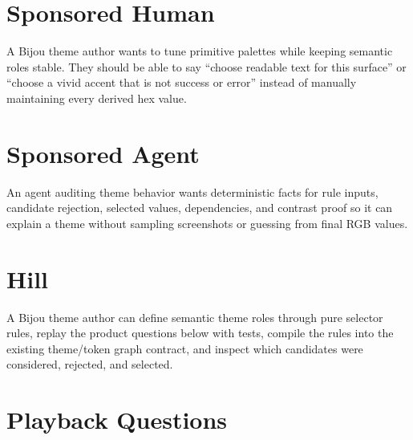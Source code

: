 \section{Sponsored Human}\label{record-184-sponsored-human}

A Bijou theme author wants to tune primitive palettes while keeping semantic roles stable. They should be able to say ``choose readable text for this surface'' or ``choose a vivid accent that is not success or error'' instead of manually maintaining every derived hex value.

\section{Sponsored Agent}\label{record-184-sponsored-agent}

An agent auditing theme behavior wants deterministic facts for rule inputs, candidate rejection, selected values, dependencies, and contrast proof so it can explain a theme without sampling screenshots or guessing from final RGB values.

\section{Hill}\label{record-184-hill}

A Bijou theme author can define semantic theme roles through pure selector rules, replay the product questions below with tests, compile the rules into the existing theme/token graph contract, and inspect which candidates were considered, rejected, and selected.

\section{Playback Questions}\label{record-184-playback-questions}

